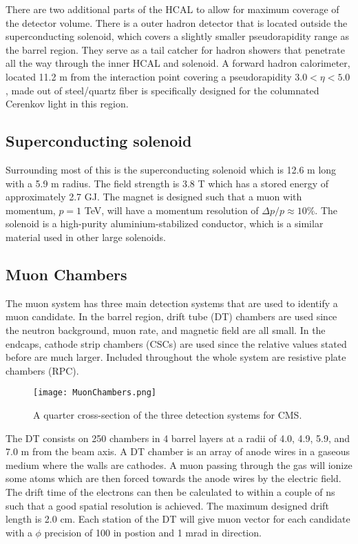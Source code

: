 There are two additional parts of the HCAL to allow for maximum coverage of the detector volume. There is a outer hadron detector that is located outside the superconducting solenoid, which covers a slightly smaller pseudorapidity range as the barrel region. They serve as a tail catcher for hadron showers that penetrate all the way through the inner HCAL and solenoid. A forward hadron calorimeter, located 11.2 m from the interaction point covering a pseudorapidity $3.0<\eta<5.0$, made out of steel/quartz fiber is specifically designed for the columnated Cerenkov light in this region. 

\subsection{Superconducting solenoid}
\label{sec:Solenoid}

Surrounding most of this is the superconducting solenoid which is 12.6 m long with a 5.9 m radius. The field strength is 3.8 T which has a stored energy of approximately 2.7 GJ. The magnet is designed such that a muon with momentum, $p=1$ TeV, will have a momentum resolution of $\Delta p/p\approx10\%$. The solenoid is a high-purity aluminium-stabilized conductor, which is a similar material used in other large solenoids. 

\subsection{Muon Chambers}
\label{sec:muCham}

The muon system has three main detection systems that are used to identify a muon candidate. In the barrel region, drift tube (DT) chambers are used since the neutron background, muon rate, and magnetic field are all small. In the endcaps, cathode strip chambers (CSCs) are used since the relative values stated before are much larger. Included throughout the whole system are resistive plate chambers (RPC). 

\begin{figure}
 	\centering
	\texttt{[image: MuonChambers.png]}
 	\caption{A quarter cross-section of the three detection systems for CMS. }
 	\label{MuonChambers} 
\end{figure}

The DT consists on 250 chambers in 4 barrel layers at a radii of 4.0, 4.9, 5.9, and 7.0 m from the beam axis. A DT chamber is an array of anode wires in a gaseous medium where the walls are cathodes. A muon passing through the gas will ionize some atoms which are then forced towards the anode wires by the electric field. The drift time of the electrons can then be calculated to within a couple of ns such that a good spatial resolution is achieved. The maximum designed drift length is 2.0 cm. Each station of the DT will give muon vector for each candidate with a $\phi$ precision of 100 \mum{} in postion and 1 mrad in direction. 

